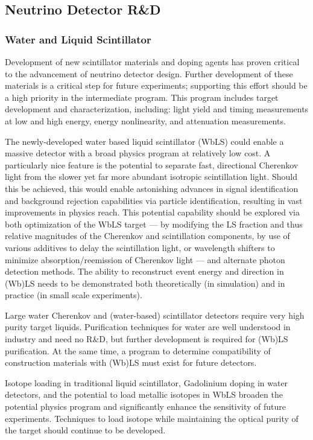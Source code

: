 \subsection{Neutrino Detector R\&D}
\label{sec:RandD}

\subsubsection{Water and Liquid Scintillator}

Development of new scintillator materials and doping agents has proven
critical to the advancement of neutrino detector design. Further
development of these materials is a critical step for future
experiments; supporting this effort should be a high priority in the
intermediate program. This program includes target development and
characterization, including: light yield and timing measurements at
low and high energy, energy nonlinearity, and attenuation
measurements.

The newly-developed water based liquid scintillator (WbLS) could
enable a massive detector with a broad physics program at relatively
low cost. A particularly nice feature is the potential to separate
fast, directional Cherenkov light from the slower yet far more
abundant isotropic scintillation light. Should this be achieved, this
would enable astonishing advances in signal identification and
background rejection capabilities via particle identification,
resulting in vast improvements in physics reach. This potential
capability should be explored via both optimization of the WbLS target
--- by modifying the LS fraction and thus relative magnitudes of the
Cherenkov and scintillation components, by use of various additives to
delay the scintillation light, or wavelength shifters to minimize
absorption/reemission of Cherenkov light --- and alternate photon
detection methods. The ability to reconstruct event energy and
direction in (Wb)LS needs to be demonstrated both theoretically (in
simulation) and in practice (in small scale experiments).

Large water Cherenkov and (water-based) scintillator detectors require
very high purity target liquids.  Purification techniques for water
are well understood in industry and need no R\&D, but further
development is required for (Wb)LS purification. At the same time, a
program to determine compatibility of construction materials with
(Wb)LS must exist for future detectors.

Isotope loading in traditional liquid scintillator, Gadolinium doping
in water detectors, and the potential to load metallic isotopes in
WbLS broaden the potential physics program and significantly enhance
the sensitivity of future experiments. Techniques to load isotope
while maintaining the optical purity of the target should continue to
be developed.

